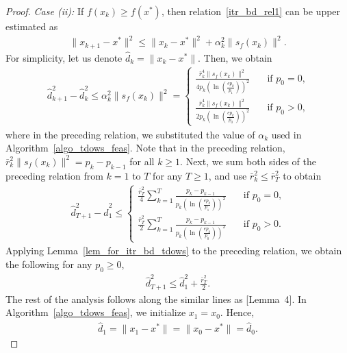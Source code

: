 \documentclass{article}
\def\a{\alpha}
\theoremstyle{plain}
\theoremstyle{definition}
\theoremstyle{remark}
\begin{document}
\begin{proof}
    \noindent\textit{Case (ii):} If $f(x_k) \geq f(x^*)$, then relation~\eqref{itr_bd_rel1} can be upper estimated as
    \begin{align*}
        \|x_{k+1} - x^*\|^2 \leq \|x_{k} - x^*\|^2 + \alpha_k^2 \|s_f(x_k)\|^2 .
    \end{align*}
    For simplicity, let us denote $\hat d_k = \|x_{k} - x^*\|$. Then, we obtain
    \begin{align*}
        \hat d_{k+1}^2 - \hat d_k^2 \leq \alpha_k^2 \|s_f(x_k)\|^2 = \begin{cases}
            \frac{\bar{r}_k^4 \|s_f(x_k)\|^2}{4 p_k \left(\ln \left( \frac{e p_k}{p_1} \right) \right)^2} \quad &\text{if $p_0 = 0$,} \\
            \frac{\bar{r}_k^4 \|s_f(x_k)\|^2}{2 p_k \left(\ln \left( \frac{e p_k}{p_0} \right) \right)^2} \quad &\text{if $p_0 > 0$,}
        \end{cases} 
    \end{align*}
    where in the preceding relation, we substituted the value of $\a_k$ used in Algorithm~\ref{algo_tdows_feas}. Note that in the preceding relation, $\bar{r}_k^2 \|s_f(x_k)\|^2 = p_k - p_{k-1}$ for all $k \geq 1$. Next, we sum both sides of the preceding relation from $k=1$ to $T$ for any $T \geq 1$, and use $\bar{r}_k^2 \leq \bar{r}_T^2$ to obtain
    \begin{align*}
        \hat d_{T+1}^2 - \hat d_1^2 \leq \begin{cases}
            \frac{\bar{r}_T^2}{4} \sum_{k=1}^T \frac{p_k - p_{k-1}}{p_k \left(\ln \left( \frac{e p_k}{p_1} \right) \right)^2} \quad &\text{if $p_0 = 0$,} \\
            \frac{\bar{r}_T^2}{2} \sum_{k=1}^T \frac{p_k - p_{k-1}}{p_k \left(\ln \left( \frac{e p_k}{p_0} \right) \right)^2} \quad &\text{if $p_0 > 0$.}
        \end{cases}
    \end{align*}
    Applying Lemma~\ref{lem_for_itr_bd_tdows} to the preceding relation, we obtain the following for any $p_0 \geq 0$,
    \begin{align}
        \hat d_{T+1}^2 \leq \hat d_1^2 + \frac{\bar{r}_T^2}{2} . \label{itr_bd_rel2}
    \end{align}
    The rest of the analysis follows along the similar lines as \cite{khaled2023dowg}[Lemma~4].
    In Algorithm~\ref{algo_tdows_feas}, we initialize $x_1 = x_0$. Hence,
    \begin{align*}
        \hat d_1 = \|x_1 - x^*\| = \|x_0 - x^*\| = \hat d_0 . 
    \end{align*}

\end{proof}
\end{document}
